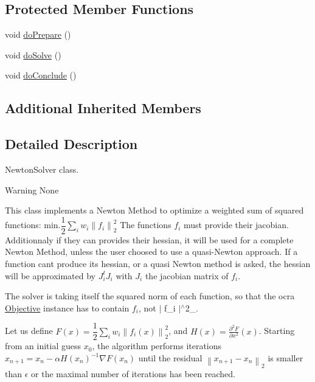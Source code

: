\subsection*{Protected Member Functions}
\begin{DoxyCompactItemize}
\item 
void \hyperlink{classocra_1_1NewtonSolver_af717009e42a86f10a793f172883cc93d}{do\+Prepare} ()
\item 
void \hyperlink{classocra_1_1NewtonSolver_ac49e1e33eb86cb15ac505e638c2fccb9}{do\+Solve} ()
\item 
void \hyperlink{classocra_1_1NewtonSolver_ae356c90b0931d0cf3571039e52647ef4}{do\+Conclude} ()
\end{DoxyCompactItemize}
\subsection*{Additional Inherited Members}


\subsection{Detailed Description}
Newton\+Solver class. 

\begin{DoxyWarning}{Warning}
None
\end{DoxyWarning}
This class implements a Newton Method to optimize a weighted sum of squared functions\+: $ \mbox{min.} \dfrac{1}{2} \sum_i{ w_i \left\| f_i \right\|^2_2} $ The functions $ f_i $ must provide their jacobian. Additionnaly if they can provides their hessian, it will be used for a complete Newton Method, unless the user choosed to use a quasi-\/\+Newton approach. If a function can\textquotesingle{}t produce its hessian, or a quasi Newton method is asked, the hessian will be approximated by $ J_i^t J_i $ with $ J_i $ the jacobian matrix of $ f_i $.

The solver is taking itself the squared norm of each function, so that the ocra \hyperlink{classocra_1_1Objective}{Objective} instance has to contain $ f_i $, not $|$ f\+\_\+i $|$$^\wedge$2\+\_.

Let us define $ F(x) = \dfrac{1}{2} \sum_i{ w_i \left\| f_i(x) \right\|^2_2} $, and $ H(x)=\frac{\partial^2 F}{\partial x^2}(x)$. Starting from an initial guess $ x_0 $, the algorithm performs iterations $ x_{n+1} = x_n - \alpha H(x_n)^{-1} \nabla F(x_n) $ until the residual $ \left\|x_{n+1} - x_n\right\|_2$ is smaller than $ \epsilon $ or the maximal number of iterations has been reached.

